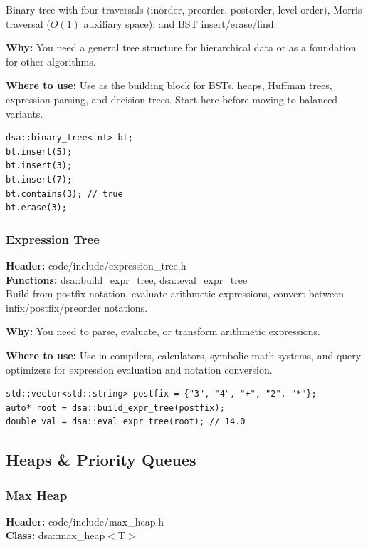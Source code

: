 \documentclass[11pt]{article}
\begin{document}
Binary tree with four traversals (inorder, preorder, postorder, level-order), Morris traversal (\(O(1)\) auxiliary space), and BST insert/erase/find.

\textbf{Why:} You need a general tree structure for hierarchical data or as a foundation for other algorithms. \par \textbf{Where to use:} Use as the building block for BSTs, heaps, Huffman trees, expression parsing, and decision trees. Start here before moving to balanced variants.

\begin{lstlisting}
dsa::binary_tree<int> bt;
bt.insert(5);
bt.insert(3);
bt.insert(7);
bt.contains(3); // true
bt.erase(3);
\end{lstlisting}

\subsubsection{Expression Tree}
\textbf{Header:} code/include/expression\_tree.h\\
\textbf{Functions:} dsa::build\_expr\_tree, dsa::eval\_expr\_tree\\

Build from postfix notation, evaluate arithmetic expressions, convert between infix/postfix/preorder notations.

\textbf{Why:} You need to parse, evaluate, or transform arithmetic expressions. \par \textbf{Where to use:} Use in compilers, calculators, symbolic math systems, and query optimizers for expression evaluation and notation conversion.

\begin{lstlisting}
std::vector<std::string> postfix = {"3", "4", "+", "2", "*"};
auto* root = dsa::build_expr_tree(postfix);
double val = dsa::eval_expr_tree(root); // 14.0
\end{lstlisting}

\subsection{Heaps \& Priority Queues}

\subsubsection{Max Heap}
\textbf{Header:} code/include/max\_heap.h\\
\textbf{Class:} dsa::max\_heap$<$T$>$\\
\end{document}
